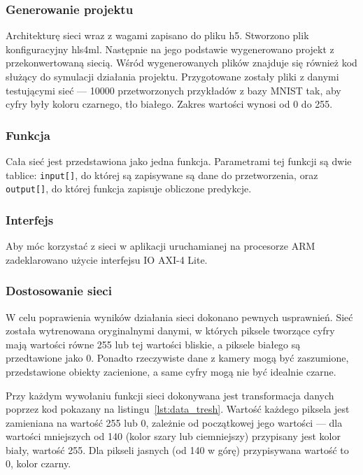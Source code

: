 \documentclass[12pt, oneside, a4paper]{article}
\begin{document}
\subsubsection{Generowanie projektu}
Architekturę sieci wraz z wagami zapisano do pliku h5. Stworzono
plik konfiguracyjny hls4ml. Następnie na jego podstawie wygenerowano projekt
z przekonwertowaną siecią. Wśród wygenerowanych plików znajduje się
również kod służący do symulacji działania projektu. Przygotowane zostały
pliki z danymi testującymi sieć --- 10000 przetworzonych przykładów z bazy
MNIST tak, aby cyfry były koloru czarnego, tło białego. Zakres wartości
wynosi od 0 do 255.

\subsubsection{Funkcja}
Cała sieć jest przedstawiona jako jedna funkcja.
Parametrami tej funkcji są dwie tablice:
\lstinline[style=hls]{input[]}, do której są zapisywane są
dane do przetworzenia,
oraz \lstinline[style=hls]{output[]}, do której funkcja zapisuje
obliczone predykcje.

\begin{minipage}{\linewidth}

\end{minipage}

\subsubsection{Interfejs}
Aby móc korzystać z sieci w aplikacji uruchamianej na procesorze ARM
zadeklarowano użycie interfejsu IO \mbox{AXI-4} Lite.

\subsubsection{Dostosowanie sieci}
W celu poprawienia wyników działania sieci dokonano pewnych usprawnień.
Sieć została wytrenowana oryginalnymi danymi, w których piksele tworzące
cyfry mają wartości równe 255 lub tej wartości bliskie,
a piksele białego są przedtawione jako 0.
Ponadto rzeczywiste dane z kamery mogą być zaszumione,
przedstawione obiekty zacienione, a same cyfry mogą nie być idealnie czarne.

Przy każdym wywołaniu funkcji sieci dokonywana jest transformacja
danych poprzez kod pokazany na listingu~\ref{lst:data_tresh}.
Wartość każdego piksela jest zamieniana na wartość 255 lub 0, zależnie
od początkowej jego wartości --- dla wartości mniejszych od 140
(kolor szary lub ciemniejszy) przypisany jest kolor biały, wartość 255.
Dla pikseli jasnych (od 140 w górę) przypisywana wartość to 0, kolor czarny.
\end{document}
